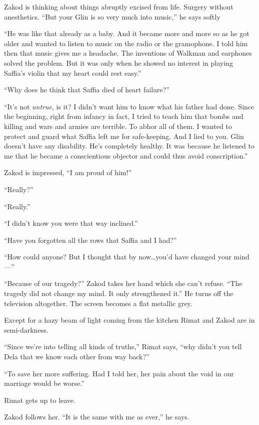 \documentclass[twoside,11pt,openany]{book}
\begin{document}
Zakod is thinking about things abruptly excised from life. Surgery without anesthetics. ``But your Glin is
so very much into music,'' he says softly

``He was like that already as a baby. And it became more and more so as he got older and wanted to listen
to music on the radio or the gramophone. I told him then that music gives me a headache. The inventions of Walkman and
earphones solved the problem. But it was only when he showed no interest in playing Saffia's violin that my heart
could rest easy.''

``Why does he think that Saffia died of heart failure?''

``It's not\textit{ untrue}, is it? I didn't want him to know what his father had done. Since the beginning,
right from infancy in fact, I tried to teach him that bombs and killing and wars and armies are terrible. To abhor all
of them. I wanted to protect and guard what Saffia left me for safe-keeping. And I lied to you. Glin doesn't have any
disability. He's completely healthy.  It was because he listened to me that he became a conscientious objector and
could thus avoid conscription.''

Zakod is impressed, ``I am proud of him!''

``Really?''

``Really.''

``I didn't know you were that way inclined.''

``Have you forgotten all the rows that Saffia and I had?''

``How could anyone?  But I thought that by now{\ldots}you'd have changed your mind ---''

``Because of our tragedy?'' Zakod takes her hand which she can't refuse. ``The
tragedy did not change my mind. It only strengthened it.'' He turns off the television altogether. The
screen becomes a flat metallic grey.

Except for a hazy beam of light coming{ }from the kitchen Rimat and
Zakod are in semi-darkness.

``Since we're into telling all kinds of truths,'' Rimat says, ``why didn't you
tell Dela that we know each other from way back?''

``To save her more suffering. Had I told her, her pain about the void in our marriage would be
worse.''

Rimat gets up to leave.

Zakod follows her. ``It is the same with me as ever,'' he says.
\end{document}
